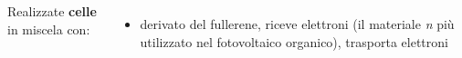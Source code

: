 \documentclass{beamer}
\begin{document}
\begin{frame}
\begin{columns}
\end{columns}
\pause
\vfill
\begin{columns}
Realizzate \textbf{celle} in miscela con:
\begin{itemize}
\item derivato del fullerene, riceve elettroni (il materiale \textit{n} più utilizzato nel fotovoltaico organico), trasporta elettroni
\end{itemize}
\end{columns}
\end{frame}
\end{document}

